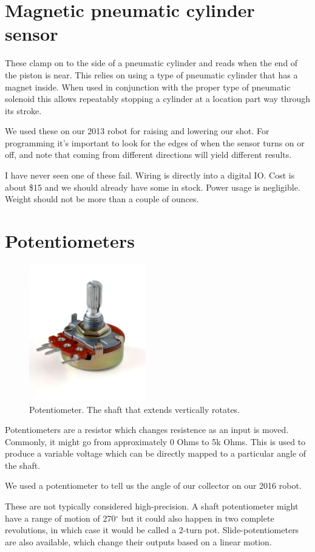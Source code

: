 \documentclass{article}
\begin{document}
\section{Magnetic pneumatic cylinder sensor}
These clamp on to the side of a pneumatic cylinder and reads when the end of the piston is near.  This relies on using a type of pneumatic cylinder that has a magnet inside.  When used in conjunction with the proper type of pneumatic solenoid this allows repeatably stopping a cylinder at a location part way through its stroke.  

We used these on our 2013 robot for raising and lowering our shot.  For programming it's important to look for the edges of when the sensor turns on or off, and note that coming from different directions will yield different results.  

I have never seen one of these fail.  Wiring is directly into a digital IO.  Cost is about \$15 and we should already have some in stock.  Power usage is negligible.  Weight should not be more than a couple of ounces.  

\section{Potentiometers}
\begin{figure}[ht]
\centering
\includegraphics[width=2in]{Potentiometer.jpg}
\caption{Potentiometer.  The shaft that extends vertically rotates.}
\end{figure}

Potentiometers are a resistor which changes resistence as an input is moved.  Commonly, it might go from approximately 0 Ohms to 5k Ohms.  This is used to produce a variable voltage which can be directly mapped to a particular angle of the shaft.  

We used a potentiometer to tell us the angle of our collector on our 2016 robot.

These are not typically considered high-precision.  A shaft potentiometer might have a range of motion of 270$^{\circ}$ but it could also happen in two complete revolutions, in which case it would be called a 2-turn pot.  Slide-potentiometers are also available, which change their outputs based on a linear motion.
\end{document}
